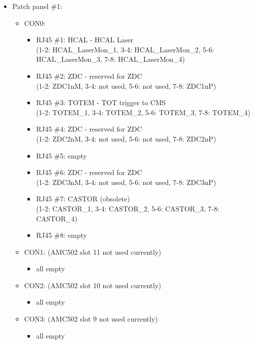 \begin{itemize}
\begin{itemize}
\begin{itemize}
\end{itemize}
\end{itemize}
\item \small Patch panel \#1:
\begin{itemize}
\item \small CON0:
\begin{itemize}
    \item \small RJ45 \#1: HCAL - HCAL Laser \\\tiny{(1-2: HCAL\_LaserMon\_1, 3-4: HCAL\_LaserMon\_2, 5-6: HCAL\_LaserMon\_3, 7-8: HCAL\_LaserMon\_4)}\normalsize
    \item \small RJ45 \#2: ZDC - reserved for ZDC \\\tiny{(1-2: ZDC1nM, 3-4: not used, 5-6: not used, 7-8: ZDC1nP)}\normalsize
    \item \small RJ45 \#3: TOTEM - TOT trigger to CMS \\\tiny{(1-2: TOTEM\_1, 3-4: TOTEM\_2, 5-6: TOTEM\_3, 7-8: TOTEM\_4)}\normalsize
    \item \small RJ45 \#4: ZDC - reserved for ZDC \\\tiny{(1-2: ZDC2nM, 3-4: not used, 5-6: not used, 7-8: ZDC2nP)}\normalsize
    \item \small RJ45 \#5: empty
    \item \small RJ45 \#6: ZDC - reserved for ZDC \\\tiny{(1-2: ZDC3nM, 3-4: not used, 5-6: not used, 7-8: ZDC3nP)}\normalsize
    \item \small RJ45 \#7: CASTOR (obsolete) \\\tiny{(1-2: CASTOR\_1, 3-4: CASTOR\_2, 5-6: CASTOR\_3, 7-8: CASTOR\_4)}\normalsize
    \item \small RJ45 \#8: empty
\end{itemize}
\item \small CON1: (AMC502 slot 11 not used currently)
\begin{itemize}
    \item all empty
\end{itemize}
\item \small CON2: (AMC502 slot 10 not used currently)
\begin{itemize}
    \item all empty
\end{itemize}
\item \small CON3: (AMC502 slot 9 not used currently)
\begin{itemize}
    \item all empty
\end{itemize}
\end{itemize}
\end{itemize}

